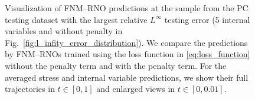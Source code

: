 \documentclass[letterpaper,11pt]{article}
\begin{document}
\begin{figure}[htb]
    \centering
    \caption{Visualization of FNM--RNO predictions at the sample from the PC testing dataset with the largest relative $L^{\infty}$ testing error (5 internal variables and without penalty in Fig.~\ref{fig:l_infity_error_distribution}). We compare the predictions by FNM--RNOs trained using the loss function in \eqref{eq:loss_function} without the penalty term and with the penalty term. For the averaged stress and internal variable predictions, we show their full trajectories in $t\in[0,1]$ and enlarged views in $t\in[0, 0.01]$.}
    \label{fig:sample_wo_penalty}
\end{figure}
\end{document}
